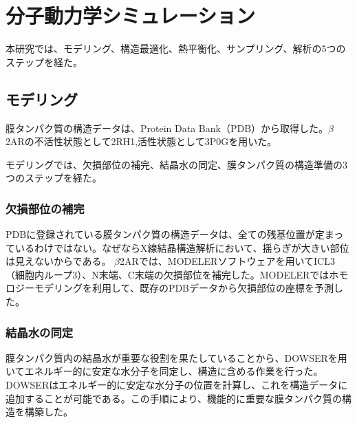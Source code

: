 \section{分子動力学シミュレーション}
本研究では、モデリング、構造最適化、熱平衡化、サンプリング、解析の5つのステップを経た。

\subsection{モデリング}
膜タンパク質の構造データは、Protein Data Bank（PDB）から取得した。$\beta$2ARの不活性状態として2RH1,活性状態として3P0Gを用いた。

モデリングでは、欠損部位の補完、結晶水の同定、膜タンパク質の構造準備の3つのステップを経た。

\subsubsection{欠損部位の補完}
PDBに登録されている膜タンパク質の構造データは、全ての残基位置が定まっているわけではない。なぜならX線結晶構造解析において、揺らぎが大きい部位は見えないからである。
$\beta$2ARでは、MODELERソフトウェアを用いてICL3（細胞内ループ3）、N末端、C末端の欠損部位を補完した。MODELERではホモロジーモデリングを利用して、既存のPDBデータから欠損部位の座標を予測した。

\subsubsection{結晶水の同定}

膜タンパク質内の結晶水が重要な役割を果たしていることから、DOWSERを用いてエネルギー的に安定な水分子を同定し、構造に含める作業を行った。
DOWSERはエネルギー的に安定な水分子の位置を計算し、これを構造データに追加することが可能である。この手順により、機能的に重要な膜タンパク質の構造を構築した。


